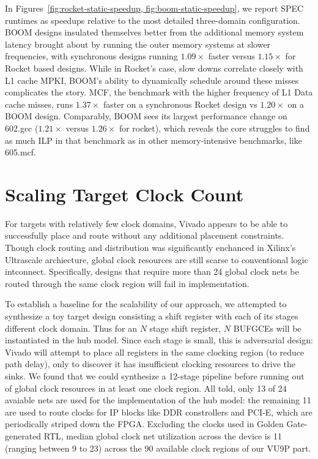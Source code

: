 In Figures~\ref{fig:rocket-static-speedup, fig:boom-static-speedup}, we report
SPEC runtimes as speedups relative to the most detailed three-domain
configuration. BOOM designs insulated themselves better from the additional
memory system latency brought about by running the outer memory systems at
slower frequencies, with synchronous designs running $1.09\times$ faster versus
$1.15\times$ for Rocket based designs. While in Rocket's case, slow downs
correlate closely with L1 cache MPKI, BOOM's ability to dynamically schedule
around these misses complicates the story.  MCF, the benchmark with the higher
frequency of L1 Data cache misses, runs $1.37\times$ faster on a synchronous
Rocket design vs $1.20\times$ on a BOOM design. Comparably, BOOM sees its
largest performance change on 602.gcc ($1.21\times$ versus $1.26\times$ for
rocket), which reveals the core struggles to find as much ILP in that
benchmark as in other memory-intensive benchmarks, like 605.mcf.



\section{Scaling Target Clock Count}

For targets with relatively few clock domains, Vivado appears to be able to
successfully place and route without any additional placement constraints.
Though clock routing and distribution was significantly enchanced in Xilinx's
Ultrascale archiecture, global clock resources are still scarse to conventional
logic intconnect. Specifically, designs that require more than 24 global clock
nets be routed through the same clock region will fail in implementation.

To establish a baseline for the scalability of our approach, we attempted to synthesize a
toy target design consisting a shift register with each of its stages different
clock domain. Thus for an $N$ stage shift register, $N$ BUFGCEs will be
instantiated in the hub model. Since each stage is small, this is adversarial
design: Vivado will attempt to place all registers in the same clocking region
(to reduce path delay), only to discover it has insufficient clocking
resources to drive the sinks. We found that we could synthesize a 12-stage
pipeline before running out of global clock resources in at least one clock
region. All told, only 13 of 24 avaiable nets are used for the implementation of
the hub model: the remaining 11 are used to route clocks for IP blocks like DDR
constrollers and PCI-E, which are periodically striped down the FPGA. Excluding
the clocks used in Golden Gate-generated RTL, median global clock net
utilization across the device is 11 (ranging between 9 to 23) across the 90
available clock regions of our VU9P part.


